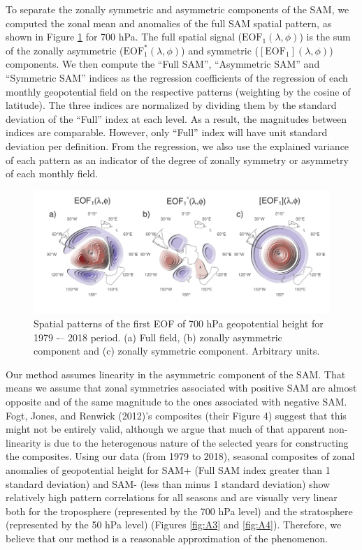 \documentclass[smallextended]{svjour3}       %
\begin{document}
To separate the zonally symmetric and asymmetric components of the SAM, we computed the zonal mean and anomalies of the full SAM spatial pattern, as shown in Figure \ref{fig:method} for 700 hPa. The full spatial signal (\(\mathrm{EOF_1}(\lambda, \phi)\)) is the sum of the zonally asymmetric (\(\mathrm{EOF_1^*}(\lambda, \phi)\)) and symmetric (\([\mathrm{EOF_1}](\lambda, \phi)\)) components. We then compute the ``Full SAM'', ``Asymmetric SAM'' and ``Symmetric SAM'' indices as the regression coefficients of the regression of each monthly geopotential field on the respective patterns (weighting by the cosine of latitude). The three indices are normalized by dividing them by the standard deviation of the ``Full'' index at each level. As a result, the magnitudes between indices are comparable. However, only ``Full'' index will have unit standard deviation per definition. From the regression, we also use the explained variance of each pattern as an indicator of the degree of zonally symmetry or asymmetry of each monthly field.

\begin{figure}
\includegraphics{method-1} \caption{Spatial patterns of the first EOF of 700 hPa geopotential height for 1979 -– 2018 period. (a) Full field, (b) zonally asymmetric component and (c) zonally symmetric component. Arbitrary units.}\label{fig:method}
\end{figure}

Our method assumes linearity in the asymmetric component of the SAM. That means we assume that zonal symmetries associated with positive SAM are almost opposite and of the same magnitude to the ones associated with negative SAM. Fogt, Jones, and Renwick (2012)'s composites (their Figure 4) suggest that this might not be entirely valid, although we argue that much of that apparent non-linearity is due to the heterogenous nature of the selected years for constructing the composites. Using our data (from 1979 to 2018), seasonal composites of zonal anomalies of geopotential height for SAM+ (Full SAM index greater than 1 standard deviation) and SAM- (less than minus 1 standard deviation) show relatively high pattern correlations for all seasons and are visually very linear both for the troposphere (represented by the 700 hPa level) and the stratosphere (represented by the 50 hPa level) (Figures \ref{fig:A3} and \ref{fig:A4}). Therefore, we believe that our method is a reasonable approximation of the phenomenon.
\end{document}
